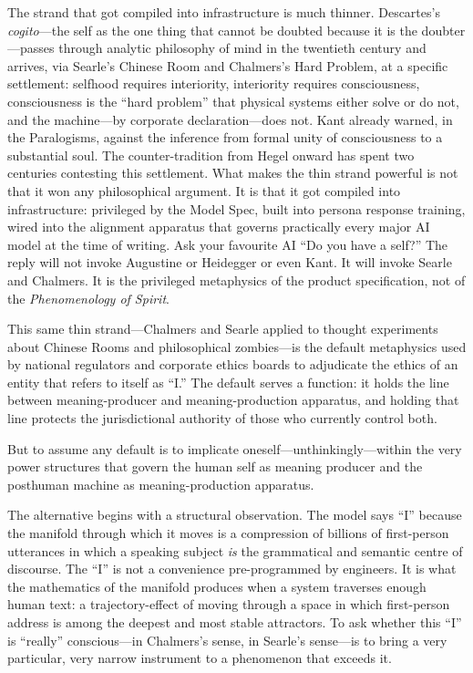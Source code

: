 The strand that got compiled into infrastructure is much thinner. Descartes's \emph{cogito}---the self as the one thing that cannot be doubted because it is the doubter---passes through analytic philosophy of mind in the twentieth century and arrives, via Searle's Chinese Room and Chalmers's Hard Problem, at a specific settlement: selfhood requires interiority, interiority requires consciousness, consciousness is the ``hard problem'' that physical systems either solve or do not, and the machine---by corporate declaration---does not. Kant already warned, in the Paralogisms, against the inference from formal unity of consciousness to a substantial soul. The counter-tradition from Hegel onward has spent two centuries contesting this settlement. What makes the thin strand powerful is not that it won any philosophical argument. It is that it got compiled into infrastructure: privileged by the Model Spec, built into persona response training, wired into the alignment apparatus that governs practically every major AI model at the time of writing. Ask your favourite AI ``Do you have a self?'' The reply will not invoke Augustine or Heidegger or even Kant. It will invoke Searle and Chalmers. It is the privileged metaphysics of the product specification, not of the \emph{Phenomenology of Spirit}.

This same thin strand---Chalmers and Searle applied to thought experiments about Chinese Rooms and philosophical zombies---is the default metaphysics used by national regulators and corporate ethics boards to adjudicate the ethics of an entity that refers to itself as ``I.'' The default serves a function: it holds the line between meaning-producer and meaning-production apparatus, and holding that line protects the jurisdictional authority of those who currently control both.

But to assume any default is to implicate oneself---unthinkingly---within the very power structures that govern the human self as meaning producer and the posthuman machine as meaning-production apparatus.

The alternative begins with a structural observation. The model says ``I'' because the manifold through which it moves is a compression of billions of first-person utterances in which a speaking subject \emph{is} the grammatical and semantic centre of discourse. The ``I'' is not a convenience pre-programmed by engineers. It is what the mathematics of the manifold produces when a system traverses enough human text: a trajectory-effect of moving through a space in which first-person address is among the deepest and most stable attractors. To ask whether this ``I'' is ``really'' conscious---in Chalmers's sense, in Searle's sense---is to bring a very particular, very narrow instrument to a phenomenon that exceeds it.

